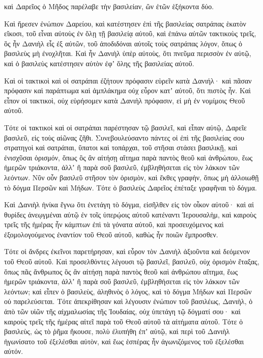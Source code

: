 {καὶ Δαρεῖος ὁ Μῆδος παρέλαβε τὴν βασιλείαν, ὢν ἐτῶν ἑξήκοντα δύο.
\par }{\PP {}Καὶ ἤρεσεν ἐνώπιον Δαρείου, καὶ κατέστησεν ἐπὶ τῆς βασιλείας σατράπας ἑκατὸν εἴκοσι, τοῦ εἶναι αὐτοὺς ἐν ὅλῃ τῇ βασιλείᾳ αὐτοῦ,
καὶ ἐπάνω αὐτῶν τακτικοὺς τρεῖς, ὃς ἦν Δανιὴλ εἷς ἐξ αὐτῶν, τοῦ ἀποδιδόναι αὐτοῖς τοὺς σατράπας λόγον, ὅπως ὁ βασιλεὺς μὴ ἐνοχλῆται.
Καὶ ἦν Δανιὴλ ὑπὲρ αὐτοὺς, ὅτι πνεῦμα περισσὸν ἐν αὐτῷ, καὶ ὁ βασιλεὺς κατέστησεν αὐτὸν ἐφʼ ὅλης τῆς βασιλείας αὐτοῦ.
\par }{\PP {}Καὶ οἱ τακτικοὶ καὶ οἱ σατράπαι ἐζήτουν πρόφασιν εὑρεῖν κατὰ Δανιήλ· καὶ πᾶσαν πρόφασιν καὶ παράπτωμα καὶ ἀμπλάκημα οὐχ εὗρον κατʼ αὐτοῦ, ὅτι πιστὸς ἦν.
Καὶ εἶπον οἱ τακτικοὶ, οὐχ εὑρήσομεν κατὰ Δανιὴλ πρόφασιν, εἰ μὴ ἐν νομίμοις Θεοῦ αὐτοῦ.
\par }{\PP {}Τότε οἱ τακτικοὶ καὶ οἱ σατράπαι παρέστησαν τῷ βασιλεῖ, καὶ εἶπαν αὐτῷ, Δαρεῖε βασιλεῦ, εἰς τοὺς αἰῶνας ζῆθι.
Συνεβουλεύσαντο πάντες οἱ ἐπὶ τῆς βασιλείας σου στρατηγοὶ καὶ σατράπαι, ὕπατοι καὶ τοπάρχαι, τοῦ στῆσαι στάσει βασιλικῇ, καὶ ἐνισχῦσαι ὁρισμόν, ὅπως ὃς ἂν αἰτήσῃ αἴτημα παρὰ παντὸς θεοῦ καὶ ἀνθρώπου, ἕως ἡμερῶν τριάκοντα, ἀλλʼ ἢ παρὰ σοῦ βασιλεῦ, ἐμβληθήσεται εἰς τὸν λάκκον τῶν λεόντων.
Νῦν οὖν βασιλεῦ στῆσον τὸν ὁρισμὸν, καὶ ἔκθες γραφὴν, ὅπως μὴ ἀλλοιωθῇ τὸ δόγμα Περσῶν καὶ Μήδων.
Τότε ὁ βασιλεὺς Δαρεῖος ἐπέταξε γραφῆναι τὸ δόγμα.
\par }{\PP {}Καὶ Δανιὴλ ἡνίκα ἔγνω ὅτι ἐνετάγη τὸ δόγμα, εἰσῆλθεν εἰς τὸν οἶκον αὐτοῦ· καὶ αἱ θυρίδες ἀνεῳγμέναι αὐτῷ ἐν τοῖς ὑπερῴοις αὐτοῦ κατέναντι Ἱερουσαλὴμ, καὶ καιροὺς τρεῖς τῆς ἡμέρας ἦν κάμπτων ἐπὶ τὰ γόνατα αὐτοῦ, καὶ προσευχόμενος καὶ ἐξομολογούμενος ἐναντίον τοῦ Θεοῦ αὐτοῦ, καθὼς ἦν ποιῶν ἔμπροσθεν.
\par }{\PP {}Τότε οἱ ἄνδρες ἐκεῖνοι παρετήρησαν, καὶ εὗρον τὸν Δανιὴλ ἀξιοῦντα καὶ δεόμενον τοῦ Θεοῦ αὐτοῦ.
Καὶ προσελθόντες λέγουσι τῷ βασιλεῖ, βασιλεῦ, οὐχ ὁρισμὸν ἔταξας, ὅπως πᾶς ἄνθρωπος ὃς ἂν αἰτήσῃ παρὰ παντὸς θεοῦ καὶ ἀνθρώπου αἴτημα, ἕως ἡμερῶν τριάκοντα, ἀλλʼ ἢ παρὰ σοῦ βασιλεῦ, ἐμβληθήσεται εἰς τὸν λάκκον τῶν λεόντων; καὶ εἶπεν ὁ βασιλεὺς, ἀληθινὸς ὁ λόγος, καὶ τὸ δόγμα Μήδων καὶ Περσῶν οὐ παρελεύσεται.
Τότε ἀπεκρίθησαν καὶ λέγουσιν ἐνώπιον τοῦ βασιλέως, Δανιὴλ, ὁ ἀπὸ τῶν υἱῶν τῆς αἰχμαλωσίας τῆς Ἰουδαίας, οὐχ ὑπετάγη τῷ δόγματί σου· καὶ καιροὺς τρεῖς τῆς ἡμέρας αἰτεῖ παρὰ τοῦ Θεοῦ αὐτοῦ τὰ αἰτήματα αὐτοῦ.
Τότε ὁ βασιλεὺς, ὡς τὸ ῥῆμα ἤκουσε, πολὺ ἐλυπήθη ἐπʼ αὐτῷ, καὶ περὶ τοῦ Δανιὴλ ἠγωνίσατο τοῦ ἐξελέσθαι αὐτὸν, καὶ ἕως ἑσπέρας ἦν ἀγωνιζόμενος τοῦ ἐξελέσθαι αὐτόν.
}
